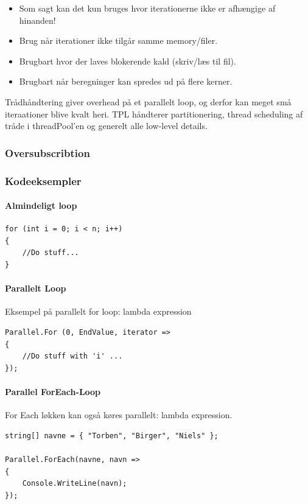 \begin{itemize}
	\item Som sagt kan det kun bruges hvor iterationerne ikke er afhængige af hinanden!
	\item Brug når iterationer ikke tilgår samme memory/filer.
	\item Brugbart hvor der laves blokerende kald (skriv/læs til fil).
	\item Brugbart når beregninger kan spredes ud på flere kerner.
\end{itemize}

Trådhåndtering giver overhead på et parallelt loop, og derfor kan meget små iteraationer blive kvalt heri. TPL håndterer partitionering, thread scheduling af tråde i threadPool'en og generelt alle low-level details.

\subsubsection{Oversubscribtion}


\subsubsection{Kodeeksempler}

\paragraph{Almindeligt loop}
\begin{lstlisting}[caption=Normal for loop, label=code:normalLoop]
for (int i = 0; i < n; i++)
{
	//Do stuff...
}
\end{lstlisting}

\paragraph{Parallelt Loop}
Eksempel på parallelt for loop: lambda expression
\begin{lstlisting}[caption=Parallel for loop,  label=code:paraLoop,
morekeywords={Parallel, For}]
Parallel.For (0, EndValue, iterator =>
{
	//Do stuff with 'i' ...
});
\end{lstlisting}

\paragraph{Parallel ForEach-Loop}
For Each løkken kan også køres parallelt: lambda expression.

\begin{lstlisting}[caption=Parallelt for each loop, label=paraForEach,morekeywords={string,Parallel, ForEach, WriteLine}]
string[] navne = { "Torben", "Birger", "Niels" };

Parallel.ForEach(navne, navn =>
{
	Console.WriteLine(navn);
});
\end{lstlisting}

